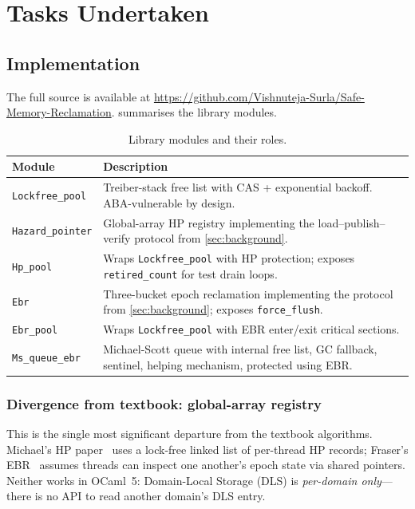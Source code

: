 \documentclass[11pt,a4paper]{article}
\begin{document}
\section{Tasks Undertaken}
\label{sec:tasks}


\subsection{Implementation}
\label{sec:impl}

The full source is available at
\url{https://github.com/Vishnuteja-Surla/Safe-Memory-Reclamation}.
 summarises the library modules.

\begin{table}[ht]
\centering\small
\caption{Library modules and their roles.}
\label{tab:modules}
\begin{tabular}{@{}lp{6.5cm}@{}}
\toprule
\textbf{Module} & \textbf{Description} \\
\midrule
\texttt{Lockfree\_pool} & Treiber-stack free list with CAS + exponential
  backoff.  ABA-vulnerable by design. \\
\texttt{Hazard\_pointer} & Global-array HP registry implementing the
  load--publish--verify protocol from \cref{sec:background}. \\
\texttt{Hp\_pool} & Wraps \texttt{Lockfree\_pool} with HP protection;
  exposes \texttt{retired\_count} for test drain loops. \\
\texttt{Ebr} & Three-bucket epoch reclamation implementing the protocol
  from \cref{sec:background}; exposes \texttt{force\_flush}. \\
\texttt{Ebr\_pool} & Wraps \texttt{Lockfree\_pool} with EBR
  enter/exit critical sections. \\
\texttt{Ms\_queue\_ebr} & Michael-Scott queue with internal free list,
  GC fallback, sentinel, helping mechanism, protected using EBR. \\
\bottomrule
\end{tabular}
\end{table}

\subsubsection{Divergence from textbook: global-array registry}
\label{sec:registry}

This is the single most significant departure from the textbook algorithms.
Michael's HP paper~\cite{michael2004hazard} uses a lock-free linked list
of per-thread HP records; Fraser's EBR~\cite{fraser2004practical} assumes
threads can inspect one another's epoch state via shared pointers.
Neither works in OCaml~5: Domain-Local Storage (DLS) is \emph{per-domain
only}---there is no API to read another domain's DLS entry.
\end{document}
